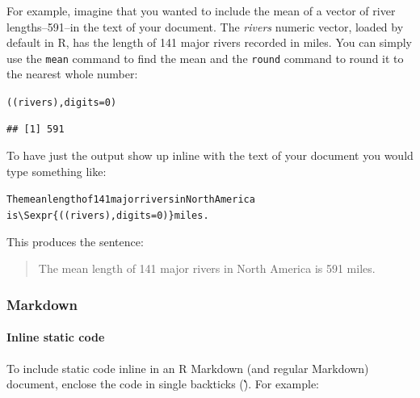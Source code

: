 For example, imagine that you wanted to include the mean of a vector of river lengths--591--in the text of your document. The {\emph{rivers}} numeric vector, loaded by default in R, has the length of 141 major rivers recorded in miles. You can simply use the {\tt{mean}} command to find the mean and the {\tt{round}} command to round it to the nearest whole number:

\begin{knitrout}
\color{fgcolor}\begin{kframe}
\begin{alltt}
((rivers), digits = 0)
\end{alltt}
\begin{verbatim}
## [1] 591
\end{verbatim}
\end{kframe}
\end{knitrout}


\noindent To have just the output show up inline with the text of your document you would type something like:

\begin{knitrout}
\color{fgcolor}\begin{kframe}
\begin{alltt}
The mean length of 141 major rivers in North America
is \textbackslash{}Sexpr\{((rivers), digits = 0)\} miles. 
\end{alltt}
\end{kframe}
\end{knitrout}


\noindent This produces the sentence:

\begin{quote}
    The mean length of 141 major rivers in North America is 591 miles. 
\end{quote}

\subsubsection{Markdown}

\paragraph{Inline static code}

To include static code inline in an R Markdown (and regular Markdown) document, enclose the code in single backticks (\` \`). For example:

